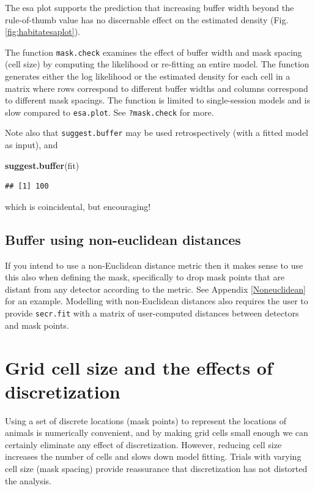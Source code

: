 \documentclass[
]{book}
\newenvironment{Shaded}{\begin{snugshade}}{\end{snugshade}}
\newcommand{\FunctionTok}[1]{\textcolor[rgb]{0.13,0.29,0.53}{\textbf{#1}}}
\newcommand{\NormalTok}[1]{#1}
\begin{document}
The esa plot supports the prediction that increasing buffer width beyond the rule-of-thumb value has no discernable effect on the estimated density (Fig. \ref{fig:habitatesaplot}).

The function \texttt{mask.check} examines the effect of buffer width and mask spacing (cell size) by computing the likelihood or re-fitting an entire model. The function generates either the log likelihood or the estimated density for each cell in a matrix where rows correspond to different buffer widths and columns correspond to different mask spacings. The function is limited to single-session models and is slow compared to \texttt{esa.plot}. See \texttt{?mask.check} for more.

Note also that \texttt{suggest.buffer} may be used retrospectively (with a fitted model as input), and

\begin{Shaded}
\begin{Highlighting}[]
\FunctionTok{suggest.buffer}\NormalTok{(fit)}
\end{Highlighting}
\end{Shaded}

\begin{verbatim}
## [1] 100
\end{verbatim}

which is coincidental, but encouraging!

\subsection{Buffer using non-euclidean distances}\label{buffer-using-non-euclidean-distances}

If you intend to use a non-Euclidean distance metric then it makes sense to use this also when defining the mask, specifically to drop mask points that are distant from any detector according to the metric. See Appendix \ref{Noneuclidean} for an example. Modelling with non-Euclidean distances also requires the user to provide \texttt{secr.fit} with a matrix of user-computed distances between detectors and mask points.

\section{Grid cell size and the effects of discretization}\label{maskspacing}

Using a set of discrete locations (mask points) to represent the locations of animals is numerically convenient, and by making grid cells small enough we can certainly eliminate any effect of discretization. However, reducing cell size increases the number of cells and slows down model fitting. Trials with varying cell size (mask spacing) provide reassurance that discretization has not distorted the analysis.
\end{document}
